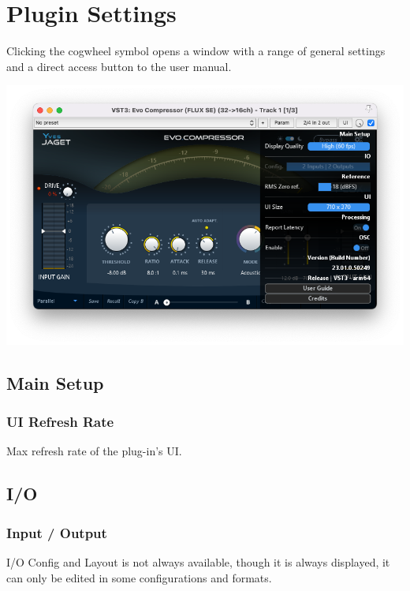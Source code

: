 \documentclass[
  letterpaper,
  DIV=11,
  numbers=noendperiod]{scrreport}
\begin{document}

\hypertarget{plugin-settings}{%
\chapter{Plugin Settings}\label{plugin-settings}}

Clicking the cogwheel symbol opens a window with a range of general
settings and a direct access button to the user manual.

\includegraphics{./include/evoComp_opt.png}

\hypertarget{main-setup}{%
\section{Main Setup}\label{main-setup}}

\hypertarget{ui-refresh-rate}{%
\subsection{UI Refresh Rate}\label{ui-refresh-rate}}

Max refresh rate of the plug-in's UI.

\hypertarget{io}{%
\section{I/O}\label{io}}

\hypertarget{input-output}{%
\subsection{Input / Output}\label{input-output}}

I/O Config and Layout is not always available, though it is always
displayed, it can only be edited in some configurations and formats.
\end{document}
